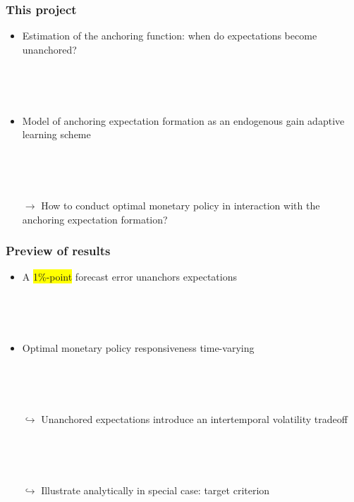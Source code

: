 \documentclass[11pt]{beamer}
\begin{document}
\begin{frame}
	\frametitle{This project}
	
	\begin{itemize}
	\item Estimation of the anchoring function: when do expectations become unanchored?
	
	\
	
	\

	\item Model of anchoring expectation formation as an endogenous gain adaptive learning scheme
	
	\
	
	\
	
	\item[$\rightarrow$] How to conduct optimal monetary policy in interaction with the anchoring expectation formation?
	\end{itemize}
	\end{frame}
\begin{frame}
	\frametitle{Preview of results}
	
	\begin{itemize}
	\item A \colorbox{yellow}{1\%-point} forecast error unanchors expectations

	
	\
	
	\
	
	\item Optimal monetary policy responsiveness time-varying 
	
	\
	
	\
	
	
	\item[$\hookrightarrow$] Unanchored expectations introduce an intertemporal volatility tradeoff 
	
	\
	
	\
	\item[$\hookrightarrow$] Illustrate analytically in special case: target criterion 

	\end{itemize}


\end{frame}
\end{document}
